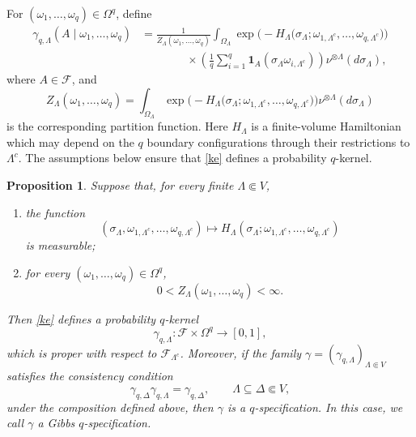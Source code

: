 \documentclass[11pt,reqno]{amsart}
\newtheorem{pro}{Proposition}
\numberwithin{equation}{section} \setcounter{tocdepth}{1}
\begin{document}
For $(\omega_1,\ldots,\omega_q)\in\Omega^q$, define
\begin{equation}\label{ke}
	\begin{aligned}
		\gamma_{q,\Lambda}(A\mid\omega_1,\ldots,\omega_q)
		&=
		\frac{1}{Z_\Lambda(\omega_1,\ldots,\omega_q)}
		\int_{\Omega_\Lambda}
		\exp\Big(
		-H_\Lambda\big(
		\sigma_\Lambda;
		\omega_{1,\Lambda^c},\ldots,\omega_{q,\Lambda^c}
		\big)
		\Big)
		\\
		&\qquad\qquad\times
		\left(
		\frac{1}{q}\sum_{i=1}^q
		\mathbf{1}_A(\sigma_\Lambda\omega_{i,\Lambda^c})
		\right)
		\nu^{\otimes\Lambda}(d\sigma_\Lambda),
	\end{aligned}
\end{equation}
where $A\in\mathcal F$, and
\begin{equation}\label{Zq}
	Z_\Lambda(\omega_1,\ldots,\omega_q)
	=
	\int_{\Omega_\Lambda}
	\exp\Big(
	-H_\Lambda\big(
	\sigma_\Lambda;
	\omega_{1,\Lambda^c},\ldots,\omega_{q,\Lambda^c}
	\big)
	\Big)
	\nu^{\otimes\Lambda}(d\sigma_\Lambda)
\end{equation}
is the corresponding partition function. Here
$H_\Lambda$ is a finite-volume Hamiltonian which may depend on the
$q$ boundary configurations through their restrictions to
$\Lambda^c$. The assumptions below ensure that
\eqref{ke} defines a probability $q$-kernel.

\begin{pro}
	Suppose that, for every finite $\Lambda\Subset V$,
	
	\begin{enumerate}
		\item the function
		\[
		(\sigma_\Lambda,\omega_{1,\Lambda^c},\ldots,\omega_{q,\Lambda^c})
		\longmapsto
		H_\Lambda(
		\sigma_\Lambda;
		\omega_{1,\Lambda^c},\ldots,\omega_{q,\Lambda^c})
		\]
		is measurable;
		
		\item for every
		$(\omega_1,\ldots,\omega_q)\in\Omega^q$,
		\[
		0<
		Z_\Lambda(\omega_1,\ldots,\omega_q)
		<\infty.
		\]
	\end{enumerate}
	
	Then \eqref{ke} defines a probability $q$-kernel
	\[
	\gamma_{q,\Lambda}:
	\mathcal F\times\Omega^q\longrightarrow[0,1],
	\]
	which is proper with respect to $\mathcal F_{\Lambda^c}$. Moreover, if
	the family
	$\gamma=(\gamma_{q,\Lambda})_{\Lambda\Subset V}$ satisfies the
	consistency condition
	\begin{equation}\label{qconsG}
		\gamma_{q,\Delta}\gamma_{q,\Lambda}
		=
		\gamma_{q,\Delta},
		\qquad
		\Lambda\subseteq\Delta\Subset V,
	\end{equation}
	under the composition defined above, then $\gamma$ is a
	$q$-specification. In this case, we call $\gamma$ a Gibbs
	$q$-specification.
\end{pro}
\end{document}

